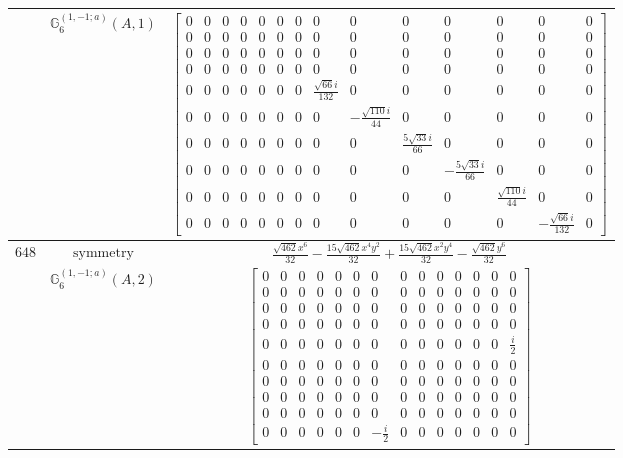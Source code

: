 \documentclass[fleqn,8pt,landscape]{jsarticle}
\begin{document}
\begin{longtable}{ccc}
$  $ & $ \mathbb{G}_{6}^{(1,-1;a)}(A,1) $ & $ \begin{bmatrix} 0 & 0 & 0 & 0 & 0 & 0 & 0 & 0 & 0 & 0 & 0 & 0 & 0 & 0 \\ 0 & 0 & 0 & 0 & 0 & 0 & 0 & 0 & 0 & 0 & 0 & 0 & 0 & 0 \\ 0 & 0 & 0 & 0 & 0 & 0 & 0 & 0 & 0 & 0 & 0 & 0 & 0 & 0 \\ 0 & 0 & 0 & 0 & 0 & 0 & 0 & 0 & 0 & 0 & 0 & 0 & 0 & 0 \\ 0 & 0 & 0 & 0 & 0 & 0 & 0 & \frac{\sqrt{66} i}{132} & 0 & 0 & 0 & 0 & 0 & 0 \\ 0 & 0 & 0 & 0 & 0 & 0 & 0 & 0 & - \frac{\sqrt{110} i}{44} & 0 & 0 & 0 & 0 & 0 \\ 0 & 0 & 0 & 0 & 0 & 0 & 0 & 0 & 0 & \frac{5 \sqrt{33} i}{66} & 0 & 0 & 0 & 0 \\ 0 & 0 & 0 & 0 & 0 & 0 & 0 & 0 & 0 & 0 & - \frac{5 \sqrt{33} i}{66} & 0 & 0 & 0 \\ 0 & 0 & 0 & 0 & 0 & 0 & 0 & 0 & 0 & 0 & 0 & \frac{\sqrt{110} i}{44} & 0 & 0 \\ 0 & 0 & 0 & 0 & 0 & 0 & 0 & 0 & 0 & 0 & 0 & 0 & - \frac{\sqrt{66} i}{132} & 0 \end{bmatrix} $ \\ \hline
$ 648 $ & $ \text{symmetry} $ & $ \frac{\sqrt{462} x^{6}}{32} - \frac{15 \sqrt{462} x^{4} y^{2}}{32} + \frac{15 \sqrt{462} x^{2} y^{4}}{32} - \frac{\sqrt{462} y^{6}}{32} $ \\
$  $ & $ \mathbb{G}_{6}^{(1,-1;a)}(A,2) $ & $ \begin{bmatrix} 0 & 0 & 0 & 0 & 0 & 0 & 0 & 0 & 0 & 0 & 0 & 0 & 0 & 0 \\ 0 & 0 & 0 & 0 & 0 & 0 & 0 & 0 & 0 & 0 & 0 & 0 & 0 & 0 \\ 0 & 0 & 0 & 0 & 0 & 0 & 0 & 0 & 0 & 0 & 0 & 0 & 0 & 0 \\ 0 & 0 & 0 & 0 & 0 & 0 & 0 & 0 & 0 & 0 & 0 & 0 & 0 & 0 \\ 0 & 0 & 0 & 0 & 0 & 0 & 0 & 0 & 0 & 0 & 0 & 0 & 0 & \frac{i}{2} \\ 0 & 0 & 0 & 0 & 0 & 0 & 0 & 0 & 0 & 0 & 0 & 0 & 0 & 0 \\ 0 & 0 & 0 & 0 & 0 & 0 & 0 & 0 & 0 & 0 & 0 & 0 & 0 & 0 \\ 0 & 0 & 0 & 0 & 0 & 0 & 0 & 0 & 0 & 0 & 0 & 0 & 0 & 0 \\ 0 & 0 & 0 & 0 & 0 & 0 & 0 & 0 & 0 & 0 & 0 & 0 & 0 & 0 \\ 0 & 0 & 0 & 0 & 0 & 0 & - \frac{i}{2} & 0 & 0 & 0 & 0 & 0 & 0 & 0 \end{bmatrix} $ \\ \hline

\end{longtable}
\end{document}

